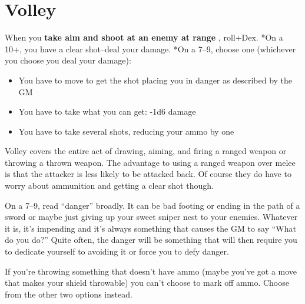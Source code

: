 \section*{Volley}
\HRule
 When you \textbf{take aim and shoot at an enemy at range}
, roll+Dex. *On a 10+, you have a clear shot--deal your damage. *On a 7--9, choose one (whichever you choose you deal your damage):
\begin{itemize}
\item You have to move to get the shot placing you in danger as described by the GM
\item You have to take what you can get: -1d6 damage
\item You have to take several shots, reducing your ammo by one
\end{itemize}
\HRule

 Volley covers the entire act of drawing, aiming, and firing a ranged weapon or throwing a thrown weapon. The advantage to using a ranged weapon over melee is that the attacker is less likely to be attacked back. Of course they do have to worry about ammunition and getting a clear shot though.


 On a 7--9, read ``danger'' broadly. It can be bad footing or ending in the path of a sword or maybe just giving up your sweet sniper nest to your enemies. Whatever it is, it's impending and it's always something that causes the GM to say ``What do you do?'' Quite often, the danger will be something that will then require you to dedicate yourself to avoiding it or force you to defy danger.


 If you're throwing something that doesn't have ammo (maybe you've got a move that makes your shield throwable) you can't choose to mark off ammo. Choose from the other two options instead.


